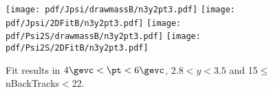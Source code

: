 \begin{figure}[H]
\begin{center}
\texttt{[image: pdf/Jpsi/drawmassB/n3y2pt3.pdf]}
\texttt{[image: pdf/Jpsi/2DFitB/n3y2pt3.pdf]}
\vspace*{-0.5cm}
\texttt{[image: pdf/Psi2S/drawmassB/n3y2pt3.pdf]}
\texttt{[image: pdf/Psi2S/2DFitB/n3y2pt3.pdf]}
\vspace*{-0.5cm}
\end{center}
\caption{Fit results in $4\gevc<\pt<6\gevc$, $2.8<y<3.5$ and 15$\leq$nBackTracks$<$22.}
\label{Fitn3y2pt3}
\end{figure}
